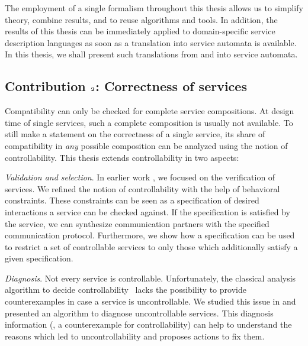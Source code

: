 The employment of a single formalism throughout this thesis allows us to simplify theory, combine results, and to reuse algorithms and tools. In addition, the results of this thesis can be immediately applied to domain-specific service description languages as soon as a translation into service automata is available. In this thesis, we shall present such translations from  and \bpelchor{} into service automata.




\subsection*{Contribution $\mathnormal{2}$: Correctness of services}

Compatibility can only be checked for complete service compositions. At design time of single services, such a complete composition is usually not available. To still make a statement on the correctness of a single service, its share of compatibility in \emph{any} possible composition can be analyzed using the notion of controllability. This thesis extends controllability in two aspects:

\begin{niceitemize}
\item \emph{Validation and selection}. In earlier work \cite{LohmannMW_2007_bpm}, we focused on the verification of services. We refined the notion of controllability with the help of behavioral constraints. These constraints can be seen as a specification of desired interactions a service can be checked against. If the specification is satisfied by the service, we can synthesize communication partners with the specified communication protocol. Furthermore, we show how a specification can be used to restrict a set of controllable services to only those which additionally satisfy a given specification.

\item \emph{Diagnosis}. Not every service is controllable. Unfortunately, the classical analysis algorithm to decide controllability~\cite{Wolf_2008_topnoc} lacks the possibility to provide counterexamples in case a service is uncontrollable. We studied this issue in \cite{Lohmann_2008_wsfm} and presented an algorithm to diagnose uncontrollable services. This diagnosis information (\ie, a counterexample for controllability) can help to understand the reasons which led to uncontrollability and proposes actions to fix them.
\end{niceitemize}




